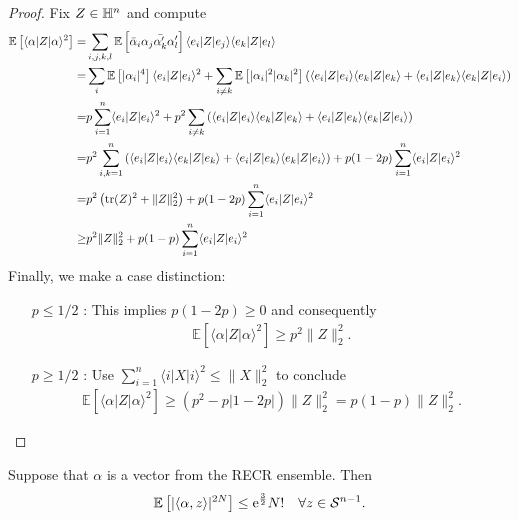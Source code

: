 \begin{proof}
Fix $ Z \in \mathbb{H}^n$ and compute
\begin{align}
  \mathbb{E} \left[ \langle \alpha |  Z | \alpha \rangle^2 \right]
  =& \sum_{i,j,k,l} \mathbb{E} \left[ \bar{\alpha}_i \alpha_j \bar{\alpha^\prime_k} \alpha^\prime_l \right] \langle  e_i| Z|  e_j \rangle \langle  e_k | Z|  e_l \rangle \\
  =& \sum_{i} \mathbb{E} \left[ | \alpha_i |^4 \right] \langle  e_i| Z| e_i \rangle^2 + \sum_{i \neq k} \mathbb{E} \left[ | \alpha_i |^2 | \alpha_k|^2 \right] \left( \langle  e_i| Z| e_i \rangle \langle  e_k| Z| e_k \rangle + \langle  e_i| Z| e_k \rangle \langle  e_k|  Z| e_i \rangle \right) \\
  =& p \sum_{i=1}^n \langle  e_i| Z| e_i \rangle^2 + p^2 \sum_{i \neq k} \left( \langle  e_i| Z| e_i \rangle \langle  e_k| Z| e_k \rangle + \langle  e_i| Z| e_k \rangle \langle  e_k | Z|  e_i\rangle \right) \\
  =& p^2 \sum_{i,k=1}^n \left( \langle  e_i| Z| e_i \rangle \langle  e_k| Z| e_k \rangle + \langle  e_i| Z| e_k \rangle \langle  e_k | Z|  e_i\rangle \right) + p(1-2 p) \sum_{i=1}^n \langle  e_i| Z| e_i \rangle^2 \\
  =& p^2 \left( \operatorname{tr} ( Z)^2 + \| Z\|_2^2 \right) + p (1-2 p) \sum_{i=1}^n \langle  e_i|  Z |  e_i \rangle^2 \\
  \geq& p^2 \| Z\|_2^2 + p(1-p) \sum_{i=1}^n \langle  e_i | Z| e_i \rangle^2
\end{align}
Finally, we make a case distinction:
\begin{itemize}
\item[$p \leq 1/2$]: This implies $p(1-2p) \geq 0$ and consequently
\begin{align}
  \mathbb{E} \left[ \langle \alpha | Z| \alpha \rangle^2 \right] \geq p^2 \|  Z \|_2^2.
\end{align}
\item[$p \geq 1/2$]: Use $\sum_{i=1}^n \langle i| X|i \rangle^2 \leq \| X \|_2^2$ to conclude
\begin{align}
  \mathbb{E} \left[ \langle \alpha |  Z | \alpha \rangle^2 \right]
\geq ( p^2 - p|1-2p|) \| Z\|_2^2 = p(1-p) \|  Z \|_2^2.
\end{align}
\end{itemize}
\end{proof}

\begin{lemma}
Suppose that $\alpha$ is a vector from the RECR ensemble. Then
\begin{align}
\mathbb{E} \left[ | \langle \alpha,  z \rangle|^{2N} \right] \leq \mathrm{e}^{\frac{3}{2}} N! \quad \forall  z \in \mathcal{S}^{n-1}.
\end{align}
\end{lemma}

